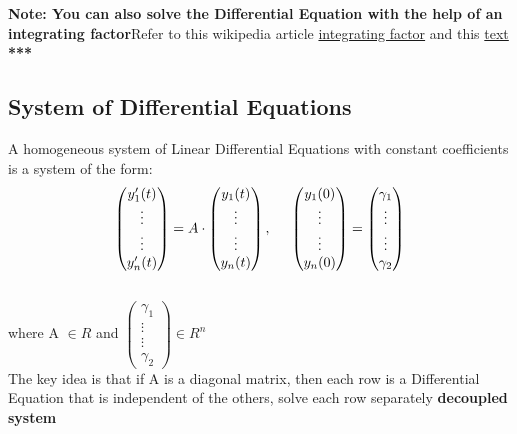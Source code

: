 \documentclass{article}
\begin{document}
\pagestyle{otherpages}
\textbf{Note: You can also solve the Differential Equation with the help of an integrating factor}\newline Refer to this wikipedia article \href{https://en.wikipedia.org/wiki/Integrating_factor}{integrating factor} and this \href{https://www.mathcentre.ac.uk/resources/uploaded/mathcentre-ode.pdf}{text}
\\[3mm]
\hspace*{70mm} \textbf{***} 
\subsection{System of Differential Equations}
A homogeneous system of Linear Differential Equations with constant coefficients is a system of the form: \\[2mm]
\begin{equation*}\begin{pmatrix} y'_1(t) \\ \vdots \\ \vdots \\ y'_n(t) \end{pmatrix} = A \cdot \begin{pmatrix} y_1(t) \\ \vdots \\ \vdots \\ y_n(t) \end{pmatrix}, \hspace{5mm} \begin{pmatrix} y_1(0) \\ \vdots \\ \vdots \\ y_n(0) \end{pmatrix} = \begin{pmatrix} \gamma_1 \\ \vdots \\ \vdots \\ \gamma_2 \end{pmatrix}\end{equation*} \\[2mm]
\hspace*{45mm} where A $\in R$ and $\begin{pmatrix} \gamma_1 \\ \vdots \\ \vdots \\ \gamma_2 \end{pmatrix} \in R^{n} $ \\[2mm]
The key idea is that if A is a diagonal matrix, then each row is a Differential Equation that is independent of the others, solve each row separately \textbf{decoupled system}
\end{document}
